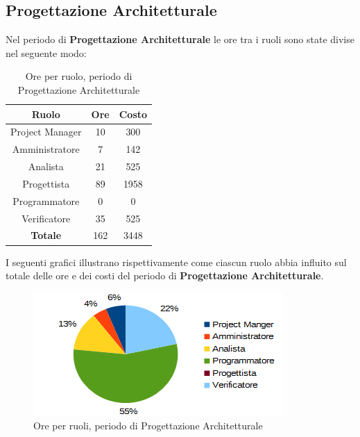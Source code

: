 	\subsection{Progettazione Architetturale}
	Nel periodo di \textbf{Progettazione Architetturale} le ore tra i ruoli sono state divise nel seguente modo: \\
	\begin{table}[H]
		\centering
		\begin{tabular}{|c|c|c|}
			\hline
			\textbf{Ruolo}		& \textbf{Ore}	& \textbf{Costo} \\
			\hline
			Project Manager		& 10			& 300	\\
			Amministratore		& 7				& 142	\\
			Analista			& 21			& 525	\\
			Progettista			& 89			& 1958	\\
			Programmatore		& 0				& 0	\\
			Verificatore		& 35			& 525	\\
			\hline
			\textbf{Totale}		& 162			& 3448	\\
			\hline
		\end{tabular}
		\caption{Ore per ruolo, periodo di Progettazione Architetturale}
		\end{table}
	I seguenti grafici illustrano rispettivamente come ciascun ruolo abbia influito sul totale
delle ore e dei costi del periodo di \textbf{Progettazione Architetturale}. \\
	\begin{figure}[H]
		\centering
		\includegraphics[width=1\linewidth]{immagini/grafici/progettazione_architetturale-torta.png}
		\caption{Ore per ruoli, periodo di Progettazione Architetturale}
	\end{figure}
